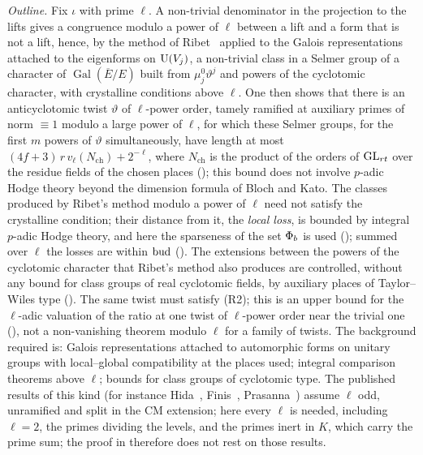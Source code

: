 \documentclass[10pt]{amsart}
\theoremstyle{definition}
\theoremstyle{remark}
\begin{document}
\noindent\emph{Outline.} Fix $\iota$ with prime $\ell$. A non-trivial denominator in the
projection to the lifts gives a congruence modulo a power of $\ell$ between a lift and a form that
is not a lift, hence, by the method of Ribet~\cite{Ribet1976} applied to the Galois
representations attached to the eigenforms on $\mathrm U(V_j)$, a non-trivial class in a Selmer group
of a character of $\operatorname{Gal}(\overline E/E)$ built from $\mu_j^0\vartheta^j$ and powers
of the cyclotomic character, with crystalline conditions above $\ell$. One then shows that there
is an anticyclotomic twist $\vartheta$ of $\ell$-power order, tamely ramified at auxiliary primes
of norm $\equiv1$ modulo a large power of $\ell$, for which these Selmer groups, for the first $m$ powers of
$\vartheta$ simultaneously, have length at most $(4f+3)\,r\,v_\ell(N_{\mathrm{ch}})+
2^{-\ell}$, where $N_{\mathrm{ch}}$ is the product of the orders of $\mathrm{GL}_{rt}$ over the residue
fields of the chosen places ({\cite[Theorem~2.9]{P55}}); this bound does not involve $p$-adic Hodge
theory beyond the dimension formula of Bloch and Kato. The classes produced by Ribet's method
modulo a power of $\ell$ need not satisfy the crystalline condition; their distance from it, the
\emph{local loss}, is bounded by integral $p$-adic Hodge theory, and here the
sparseness of the set $\Phi_b$ is used ({\cite[Proposition~2.28]{P55}}); summed over $\ell$ the losses
are within $\mathrm{bud}$ ({\cite[Lemma~2.5]{P55}}). The extensions between the powers of the cyclotomic
character that Ribet's method also produces are controlled, without any bound for class groups of
real cyclotomic fields, by auxiliary places of Taylor--Wiles type ({\cite[Proposition~2.26]{P55}}). The same twist must satisfy (R2); this is an upper bound for the
$\ell$-adic valuation of the ratio at one twist of $\ell$-power order near the trivial one
({\cite[Proposition~3.15]{P55}}), not a non-vanishing theorem modulo $\ell$ for a family of twists. The background required is: Galois
representations attached to automorphic forms on unitary groups with local--global compatibility
at the places used; integral comparison theorems above $\ell$; bounds for class groups of
cyclotomic type. The published results of this kind (for instance Hida~\cite{HidaNonvanishing},
Finis~\cite{Finis}, Prasanna~\cite{Prasanna}) assume $\ell$ odd, unramified and split in the CM
extension; here every $\ell$ is needed, including $\ell=2$, the primes dividing the levels, and
the primes inert in $K$, which carry the prime sum; the proof in {\cite[\S2]{P55}} therefore
does not rest on those results.
\end{document}
